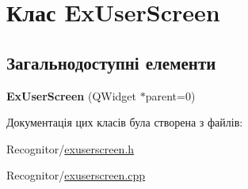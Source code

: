 \hypertarget{classExUserScreen}{\section{Клас Ex\-User\-Screen}
\label{classExUserScreen}
}
\subsection*{Загальнодоступні елементи}
\begin{DoxyCompactItemize}
\item 
\hypertarget{classExUserScreen_a8642db4f09c4528daf7e22ce2dcc1b47}{{\bfseries Ex\-User\-Screen} (Q\-Widget $\ast$parent=0)}\label{classExUserScreen_a8642db4f09c4528daf7e22ce2dcc1b47}

\end{DoxyCompactItemize}


Документація цих класів була створена з файлів\-:\begin{DoxyCompactItemize}
\item 
Recognitor/\hyperlink{exuserscreen_8h}{exuserscreen.\-h}\item 
Recognitor/\hyperlink{exuserscreen_8cpp}{exuserscreen.\-cpp}\end{DoxyCompactItemize}
